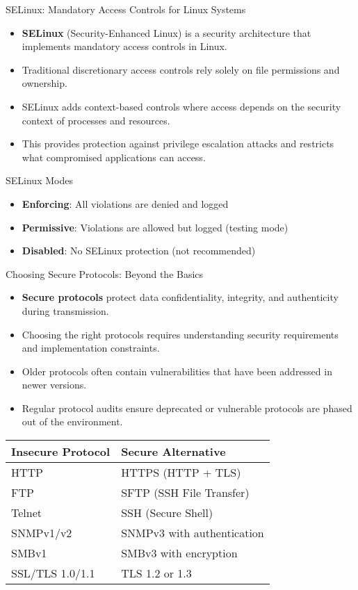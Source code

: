 \documentclass{beamer}
\begin{document}
\begin{frame}{SELinux: Mandatory Access Controls for Linux Systems}
\begin{itemize}
\item \textbf{SELinux} (Security-Enhanced Linux) is a security architecture that implements mandatory access controls in Linux.
\item Traditional discretionary access controls rely solely on file permissions and ownership.
\item SELinux adds context-based controls where access depends on the security context of processes and resources.
\item This provides protection against privilege escalation attacks and restricts what compromised applications can access.
\end{itemize}

\begin{alertblock}{SELinux Modes}
\begin{itemize}
\item \textbf{Enforcing}: All violations are denied and logged
\item \textbf{Permissive}: Violations are allowed but logged (testing mode)
\item \textbf{Disabled}: No SELinux protection (not recommended)
\end{itemize}
\end{alertblock}
\end{frame}

\begin{frame}{Choosing Secure Protocols: Beyond the Basics}
\begin{itemize}
\item \textbf{Secure protocols} protect data confidentiality, integrity, and authenticity during transmission.
\item Choosing the right protocols requires understanding security requirements and implementation constraints.
\item Older protocols often contain vulnerabilities that have been addressed in newer versions.
\item Regular protocol audits ensure deprecated or vulnerable protocols are phased out of the environment.
\end{itemize}

\begin{tabular}{ll}
\textbf{Insecure Protocol} & \textbf{Secure Alternative} \\
\hline
HTTP & HTTPS (HTTP + TLS) \\
FTP & SFTP (SSH File Transfer) \\
Telnet & SSH (Secure Shell) \\
SNMPv1/v2 & SNMPv3 with authentication \\
SMBv1 & SMBv3 with encryption \\
SSL/TLS 1.0/1.1 & TLS 1.2 or 1.3 \\
\end{tabular}
\end{frame}
\end{document}
